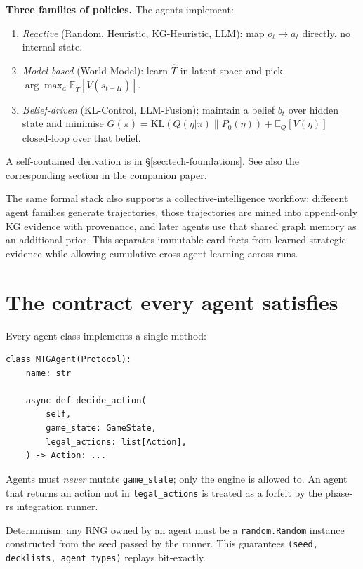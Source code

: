 \documentclass[11pt,a4paper]{article}
\begin{document}
\noindent\textbf{Three families of policies.}  The agents implement:
%
\begin{enumerate}[leftmargin=*]
  \item \emph{Reactive} (Random, Heuristic, KG-Heuristic, LLM): map
        $o_t \to a_t$ directly, no internal state.
  \item \emph{Model-based} (World-Model): learn $\hat T$ in latent space
        and pick $\arg\max_a \mathbb{E}_{\hat T}[V(s_{t+H})]$.
  \item \emph{Belief-driven} (KL-Control, LLM-Fusion):
        maintain a belief $b_t$ over hidden state and minimise
        $G(\pi) = \mathrm{KL}(Q(\eta|\pi)\|P_0(\eta)) + \mathbb{E}_Q[V(\eta)]$
        closed-loop over that belief.
\end{enumerate}
%
A self-contained derivation is in \S\ref{sec:tech-foundations}.  See
also the corresponding section in the companion paper.

The same formal stack also supports a collective-intelligence workflow:
different agent families generate trajectories, those trajectories are
mined into append-only KG evidence with provenance, and later agents use
that shared graph memory as an additional prior. This separates immutable
card facts from learned strategic evidence while allowing cumulative
cross-agent learning across runs.

\section{The contract every agent satisfies}
\label{sec:contract}

Every agent class implements a single method:
%
\begin{lstlisting}
class MTGAgent(Protocol):
    name: str

    async def decide_action(
        self,
        game_state: GameState,
        legal_actions: list[Action],
    ) -> Action: ...
\end{lstlisting}
%
Agents must \emph{never} mutate \texttt{game\_state}; only the engine is
allowed to.  An agent that returns an action not in
\texttt{legal\_actions} is treated as a forfeit by
the phase-rs integration runner.

Determinism: any RNG owned by an agent must be a \texttt{random.Random}
instance constructed from the seed passed by the runner.  This
guarantees \texttt{(seed, decklists, agent\_types)} replays bit-exactly.
\end{document}

